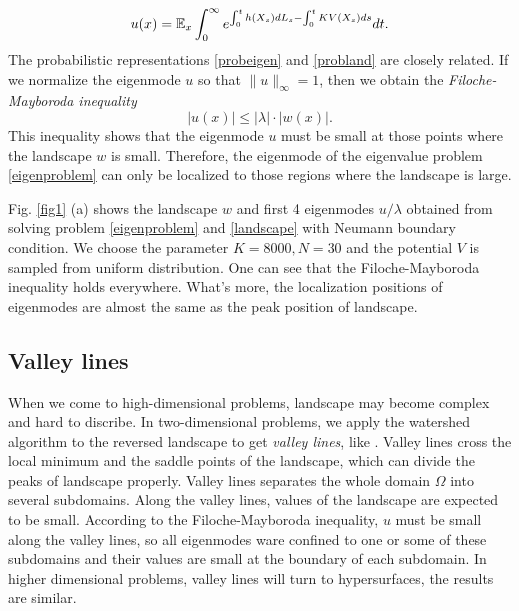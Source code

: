 \documentclass[a4paper,11pt]{article}
\begin{document}
\begin{equation}\label{probland}
u(x) = \mathbb{E}_x \int_{0}^{\infty} e^{\int_{0}^{t} h(X_s) dL_s - \int_{0}^{t} KV(X_s) ds} dt.
\end{equation}
The probabilistic representations \eqref{probeigen} and \eqref{probland} are closely related. If we normalize the eigenmode $u$ so that $\|u\|_\infty = 1$, then we obtain the \emph{Filoche-Mayboroda inequality}
\begin{equation*}
|u(x)| \leq |\lambda| \cdot |w(x)|.
\end{equation*}
This inequality shows that the eigenmode $u$ must be small at those points where the landscape $w$ is small. Therefore, the eigenmode of the eigenvalue problem \eqref{eigenproblem} can only be localized to those regions where the landscape is large.

Fig. \ref{fig1} (a) shows the landscape $w$ and first 4 eigenmodes $u / \lambda$ obtained from solving problem \eqref{eigenproblem} and \eqref{landscape} with Neumann boundary condition. We choose the parameter $K = 8000, N = 30$ and the potential $V$ is sampled from uniform distribution. One can see that the Filoche-Mayboroda inequality holds everywhere. What's more, the localization positions of eigenmodes are almost the same as the peak position of landscape.

\subsection{Valley lines}

When we come to high-dimensional problems, landscape may become complex and hard to discribe. In two-dimensional problems, we apply the watershed algorithm to the reversed landscape to get \emph{valley lines}, like \cite{filoche2012universal}. Valley lines cross the local minimum and the saddle points of the landscape, which can divide the peaks of landscape properly. Valley lines separates the whole domain $\Omega$ into several subdomains. Along the valley lines, values of the landscape are expected to be small. According to the Filoche-Mayboroda inequality, $u$ must be small along the valley lines, so all eigenmodes ware confined to one or some of these subdomains and their values are small at the boundary of each subdomain. In higher dimensional problems, valley lines will turn to hypersurfaces, the results are similar.

\end{document}
